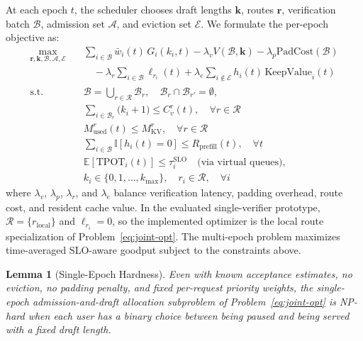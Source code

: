 \documentclass[journal]{IEEEtran}
\newtheorem{lemma}{Lemma}
\newcommand{\ind}{\mathbb{I}}
\begin{document}
At each epoch $t$, the scheduler chooses draft lengths 
$\mathbf{k}$, routes $\mathbf{r}$, verification batch
$\mathcal{B}$, admission set $\mathcal{A}$, and eviction set
$\mathcal{E}$. We 
formulate the per-epoch objective as:
\begin{equation}
    \label{eq:joint-opt}
    \begin{aligned}
    \max_{\mathbf{r},\mathbf{k}, \mathcal{B}, \mathcal{A}, \mathcal{E}} 
    \quad & \sum_{i \in \mathcal{B}} \bar{w}_i(t) \, G_i(k_i, t) 
    - \lambda_v V(\mathcal{B}, \mathbf{k}) 
    - \lambda_p \text{PadCost}(\mathcal{B}) \\
    & \quad - \lambda_r\sum_{i\in\mathcal{B}}\ell_{r_i}(t)
    + \lambda_e \sum_{i \notin \mathcal{E}} 
    h_i(t)\,\text{KeepValue}_i(t) \\
    \text{s.t.} \quad 
    & \mathcal{B}=\bigcup_{r\in\mathcal{R}}\mathcal{B}_r,
    \quad \mathcal{B}_r\cap\mathcal{B}_{r'}=\emptyset, \\
    & \sum_{i \in \mathcal{B}_r} \bigl(k_i{+}1\bigr) \leq C_v^r(t), 
    \quad \forall r \in \mathcal{R} \\
    & M_{\text{used}}^r(t) \leq M_{\text{KV}}^r, 
    \quad \forall r \in \mathcal{R} \\
    & \sum_{i \in \mathcal{B}} \ind[h_i(t)=0]
    \leq R_{\text{prefill}}(t), \quad \forall t \\
    & \mathbb{E}[\text{TPOT}_i(t)] \leq \tau_i^{\text{SLO}} 
    \quad \text{(via virtual queues)}, \\
    & k_i \in \{0, 1, \ldots, k_{\max}\}, 
    \quad r_i\in\mathcal{R}, \quad \forall i
    \end{aligned}
\end{equation}
where $\lambda_v$, $\lambda_p$, $\lambda_r$, and $\lambda_e$ balance 
verification latency, padding overhead, route cost, and resident cache
value. In the evaluated single-verifier prototype,
$\mathcal{R}=\{r_{\mathrm{local}}\}$ and $\ell_{r_i}=0$, so the
implemented optimizer is the local route specialization of
Problem~\eqref{eq:joint-opt}. 
The multi-epoch problem maximizes time-averaged SLO-aware 
goodput subject to the constraints above.

\begin{lemma}[Single-Epoch Hardness]
\label{prop:hardness}
Even with known acceptance estimates, no eviction, no 
padding penalty, and fixed per-request priority weights, 
the single-epoch admission-and-draft allocation subproblem 
of Problem~\eqref{eq:joint-opt} is NP-hard when each user 
has a binary choice between being paused and being served 
with a fixed draft length.
\end{lemma}
\end{document}
